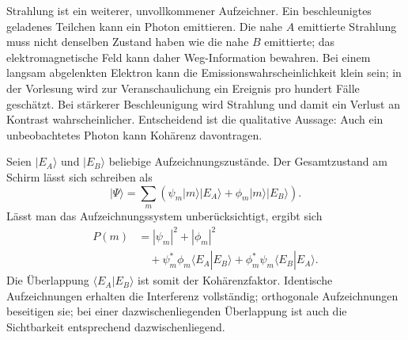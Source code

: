 Strahlung ist ein weiterer, unvollkommener Aufzeichner. Ein beschleunigtes geladenes Teilchen kann ein Photon emittieren. Die nahe \(A\) emittierte Strahlung muss nicht denselben Zustand haben wie die nahe \(B\) emittierte; das elektromagnetische Feld kann daher Weg-Information bewahren. Bei einem langsam abgelenkten Elektron kann die Emissionswahrscheinlichkeit klein sein; in der Vorlesung wird zur Veranschaulichung ein Ereignis pro hundert Fälle geschätzt. Bei stärkerer Beschleunigung wird Strahlung und damit ein Verlust an Kontrast wahrscheinlicher. Entscheidend ist die qualitative Aussage: Auch ein unbeobachtetes Photon kann Kohärenz davontragen.

\begin{classroomqa}
\end{classroomqa}

\begin{classroomqa}
\end{classroomqa}

Seien \(|E_A\rangle\) und \(|E_B\rangle\) beliebige Aufzeichnungszustände. Der Gesamtzustand am Schirm lässt sich schreiben als
\begin{equation}
|\Psi\rangle
=\sum_m\left(
\psi_m|m\rangle|E_A\rangle
+\phi_m|m\rangle|E_B\rangle
\right).
\end{equation}
Lässt man das Aufzeichnungssystem unberücksichtigt, ergibt sich
\begin{align}
P(m)
&=|\psi_m|^2+|\phi_m|^2 \\
&\quad
+\psi_m^*\phi_m\langle E_A|E_B\rangle
+\phi_m^*\psi_m\langle E_B|E_A\rangle.
\end{align}
Die Überlappung \(\langle E_A|E_B\rangle\) ist somit der Kohärenzfaktor. Identische Aufzeichnungen erhalten die Interferenz vollständig; orthogonale Aufzeichnungen beseitigen sie; bei einer dazwischenliegenden Überlappung ist auch die Sichtbarkeit entsprechend dazwischenliegend.

